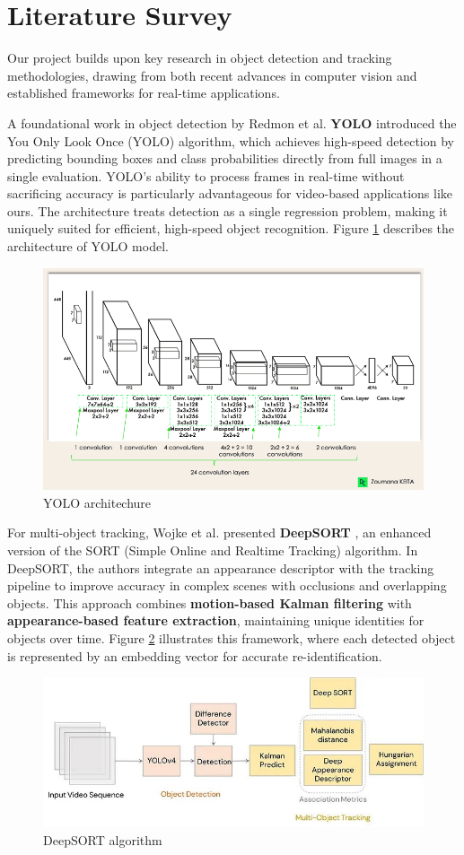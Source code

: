 \documentclass[twoside,english]{article}
\begin{document}
\section{Literature Survey} \label{sec:litsurvey}
    Our project builds upon key research in object detection and tracking methodologies, drawing from both recent advances in computer vision and established frameworks for real-time applications.

    A foundational work in object detection by Redmon et al. \textbf{YOLO} \citep{YOLO_paper} introduced the You Only Look Once (YOLO) algorithm, which achieves high-speed detection by predicting bounding boxes and class probabilities directly from full images in a single evaluation. YOLO’s ability to process frames in real-time without sacrificing accuracy is particularly advantageous for video-based applications like ours. The architecture treats detection as a single regression problem, making it uniquely suited for efficient, high-speed object recognition. Figure \ref{yolo_fig} describes the architecture of YOLO model.
    
    \begin{figure}[!h]
        \centering
        \includegraphics[width=0.5\linewidth]{imgs/YOLO_Architecture_.png}
        \caption{YOLO architechure}
        \label{yolo_fig}
    \end{figure}
    
    For multi-object tracking, Wojke et al. presented \textbf{DeepSORT} \citep{DeepSORT_paper}, an enhanced version of the SORT (Simple Online and Realtime Tracking) algorithm. In DeepSORT, the authors integrate an appearance descriptor with the tracking pipeline to improve accuracy in complex scenes with occlusions and overlapping objects. This approach combines \textbf{motion-based Kalman filtering} with \textbf{appearance-based feature extraction}, maintaining unique identities for objects over time. Figure \ref{deepsort_fig} illustrates this framework, where each detected object is represented by an embedding vector for accurate re-identification.

    \begin{figure}[!h]
        \centering
        \includegraphics[width=0.5\linewidth]{imgs/DeepSort_framework.jpg}
        \caption{DeepSORT algorithm}
        \label{deepsort_fig}
    \end{figure}
    
\end{document}
